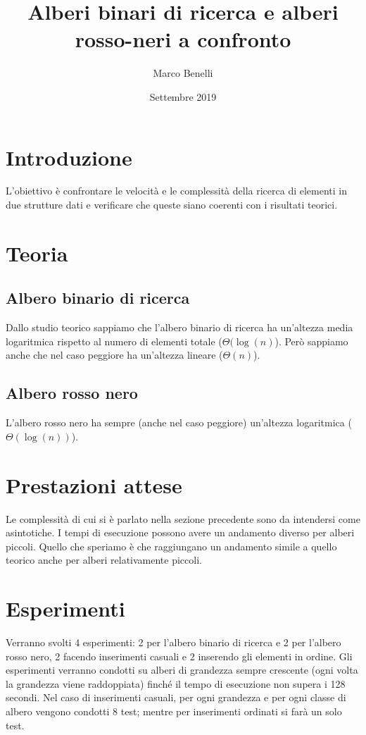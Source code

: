 \documentclass{article}
\title{Alberi binari di ricerca e alberi rosso-neri a confronto}
\author{Marco Benelli}
\date{Settembre 2019}
\begin{document}
\maketitle

\section{Introduzione}

L'obiettivo è confrontare le velocità e le complessità della ricerca di elementi in due strutture dati e verificare che queste siano coerenti con i risultati teorici.

\section{Teoria}

\subsection{Albero binario di ricerca}

Dallo studio teorico sappiamo che l'albero binario di ricerca ha un'altezza media logaritmica rispetto al numero di elementi totale ($\Theta(\log(n)$). Però sappiamo anche che nel caso peggiore ha un'altezza lineare ($\Theta(n)$).

\subsection{Albero rosso nero}

L'albero rosso nero ha sempre (anche nel caso peggiore) un'altezza logaritmica ($\Theta(\log(n))$).

\section{Prestazioni attese}

Le complessità di cui si è parlato nella sezione precedente sono da intendersi come asintotiche. I tempi di esecuzione possono avere un andamento diverso per alberi piccoli. Quello che speriamo è che raggiungano un andamento simile a quello teorico anche per alberi relativamente piccoli.

\section{Esperimenti}

Verranno svolti 4 esperimenti: 2 per l'albero binario di ricerca e 2 per l'albero rosso nero, 2 facendo inserimenti casuali e 2 inserendo gli elementi in ordine. Gli esperimenti verranno condotti su alberi di grandezza sempre crescente (ogni volta la grandezza viene raddoppiata) finché il tempo di esecuzione non supera i 128 secondi. Nel caso di inserimenti casuali, per ogni grandezza e per ogni classe di albero vengono condotti 8 test; mentre per inserimenti ordinati si farà un solo test.
\end{document}
